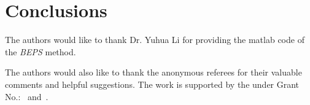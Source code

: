 \section{Conclusions}



\begin{acks}
  The authors would like to thank Dr. Yuhua Li for providing the
  matlab code of  the \textit{BEPS} method. 

  The authors would also like to thank the anonymous referees for
  their valuable comments and helpful suggestions. The work is
  supported by the  under Grant
  No.:~
  and~.

\end{acks}
